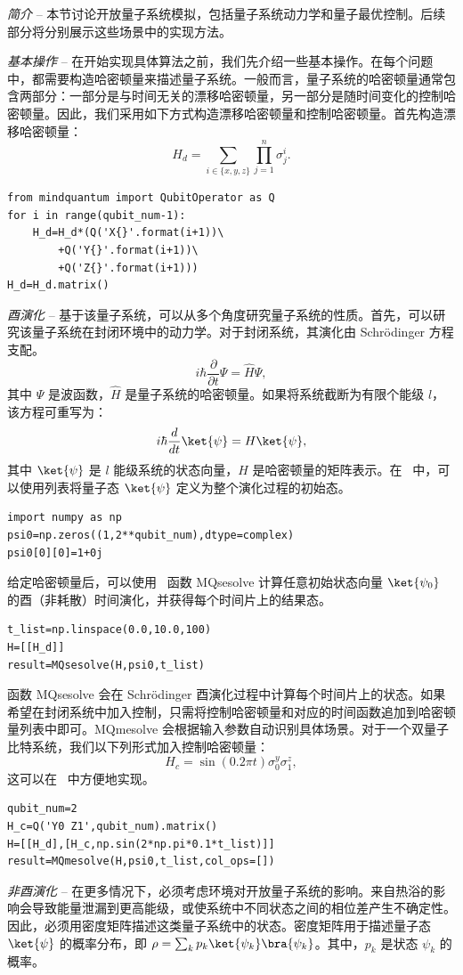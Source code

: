 \textit{简介} -- 本节讨论开放量子系统模拟，包括量子系统动力学和量子最优控制。后续部分将分别展示这些场景中的实现方法。

\textit{基本操作} -- 在开始实现具体算法之前，我们先介绍一些基本操作。在每个问题中，都需要构造哈密顿量来描述量子系统。一般而言，量子系统的哈密顿量通常包含两部分：一部分是与时间无关的漂移哈密顿量，另一部分是随时间变化的控制哈密顿量。因此，我们采用如下方式构造漂移哈密顿量和控制哈密顿量。首先构造漂移哈密顿量：
\begin{equation}
    H_{d}=\sum_{i\in\{x,y,z\}}\prod_{j=1}^{n}\sigma_{j}^{i}.
\end{equation}
\begin{lstlisting}
from mindquantum import QubitOperator as Q
for i in range(qubit_num-1):
    H_d=H_d*(Q('X{}'.format(i+1))\
        +Q('Y{}'.format(i+1))\
        +Q('Z{}'.format(i+1)))
H_d=H_d.matrix()
\end{lstlisting}
\textit{酉演化} -- 基于该量子系统，可以从多个角度研究量子系统的性质。首先，可以研究该量子系统在封闭环境中的动力学。对于封闭系统，其演化由 Schr\"{o}dinger 方程支配。
\begin{equation}
    i\hbar\frac{\partial}{\partial t}\Psi=\hat{H}\Psi,
\end{equation}
其中 $\Psi$ 是波函数，$\hat{H}$ 是量子系统的哈密顿量。如果将系统截断为有限个能级 $l$，该方程可重写为：
\begin{equation}
    i\hbar\frac{d}{dt}\ket{\psi}=H\ket{\psi},
    \label{shro}
\end{equation}
其中 $\ket{\psi}$ 是 $l$ 能级系统的状态向量，$H$ 是哈密顿量的矩阵表示。在 \MindQuantum\ 中，可以使用列表将量子态 $\ket{\psi}$ 定义为整个演化过程的初始态。
\begin{lstlisting}
import numpy as np
psi0=np.zeros((1,2**qubit_num),dtype=complex)
psi0[0][0]=1+0j
\end{lstlisting}
给定哈密顿量后，可以使用 \MindQuantum\ 函数 MQsesolve 计算任意初始状态向量 $\ket{\psi_{0}}$ 的酉（非耗散）时间演化，并获得每个时间片上的结果态。
\begin{lstlisting}
t_list=np.linspace(0.0,10.0,100)
H=[[H_d]]
result=MQsesolve(H,psi0,t_list)
\end{lstlisting}
函数 MQsesolve 会在 Schr\"{o}dinger 酉演化过程中计算每个时间片上的状态。如果希望在封闭系统中加入控制，只需将控制哈密顿量和对应的时间函数追加到哈密顿量列表中即可。MQmesolve 会根据输入参数自动识别具体场景。对于一个双量子比特系统，我们以下列形式加入控制哈密顿量：
\begin{equation}
    H_{c}=\sin(0.2\pi t)\sigma_{0}^{y}\sigma_{1}^{z},
\end{equation}
这可以在 \MindQuantum\ 中方便地实现。
\begin{lstlisting}
qubit_num=2
H_c=Q('Y0 Z1',qubit_num).matrix()
H=[[H_d],[H_c,np.sin(2*np.pi*0.1*t_list)]]
result=MQmesolve(H,psi0,t_list,col_ops=[])
\end{lstlisting}
\textit{非酉演化} -- 在更多情况下，必须考虑环境对开放量子系统的影响。来自热浴的影响会导致能量泄漏到更高能级，或使系统中不同状态之间的相位差产生不确定性。因此，必须用密度矩阵描述这类量子系统中的状态。密度矩阵用于描述量子态 $\ket{\psi}$ 的概率分布，即 $\rho=\sum_{k}p_{k}\ket{\psi_{k}}\bra{\psi_{k}}$。其中，$p_k$ 是状态 $\psi_k$ 的概率。

